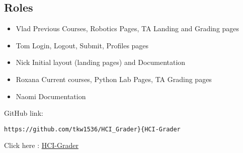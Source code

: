 \subsection{Roles}

\begin{small}
\begin{itemize}
  \item {Vlad} Previous Courses, Robotics Pages, TA Landing and Grading pages
  \item {Tom} Login, Logout, Submit, Profiles pages
  \item {Nick} Initial layout (landing pages) and Documentation
  \item {Roxana} Current courses, Python Lab Pages, TA Grading pages
  \item{Naomi} Documentation
\end{itemize}

GitHub link:
\begin{verbatim}
https://github.com/tkw1536/HCI_Grader}{HCI-Grader
\end{verbatim}
Click here : \href{https://github.com/tkw1536/HCI_Grader}{HCI-Grader}
\end{small}